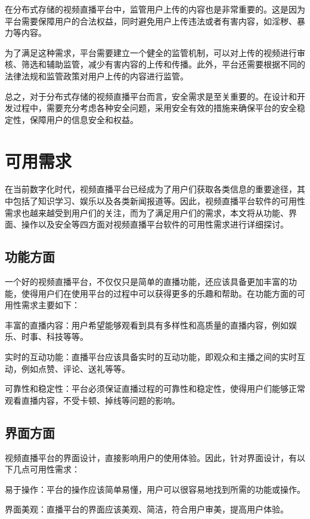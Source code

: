     在分布式存储的视频直播平台中，监管用户上传的内容也是非常重要的。这是因为平台需要保障用户的合法权益，同时避免用户上传违法或者有害内容，如淫秽、暴力等内容。
    
    为了满足这种需求，平台需要建立一个健全的监管机制，可以对上传的视频进行审核、筛选和辅助监管，减少有害内容的上传和传播。此外，平台还需要根据不同的法律法规和监管政策对用户上传的内容进行监管。

总之，对于分布式存储的视频直播平台而言，安全需求是至关重要的。在设计和开发过程中，需要充分考虑各种安全问题，采用安全有效的措施来确保平台的安全稳定性，保障用户的信息安全和权益。

\section{可用需求}

在当前数字化时代，视频直播平台已经成为了用户们获取各类信息的重要途径，其中包括了知识学习、娱乐以及各类新闻报道等。因此，视频直播平台软件的可用性需求也越来越受到用户们的关注，而为了满足用户们的需求，本文将从功能、界面、操作以及安全等四方面对视频直播平台软件的可用性需求进行详细探讨。

\subsection{功能方面}

一个好的视频直播平台，不仅仅只是简单的直播功能，还应该具备更加丰富的功能，使得用户们在使用平台的过程中可以获得更多的乐趣和帮助。在功能方面的可用性需求主要如下：

丰富的直播内容：用户希望能够观看到具有多样性和高质量的直播内容，例如娱乐、时事、科技等等。

实时的互动功能：直播平台应该具备实时的互动功能，即观众和主播之间的实时互动，例如点赞、评论、送礼等等。

可靠性和稳定性：平台必须保证直播过程的可靠性和稳定性，使得用户们能够正常观看直播内容，不受卡顿、掉线等问题的影响。

\subsection{界面方面}

视频直播平台的界面设计，直接影响用户的使用体验。因此，针对界面设计，有以下几点可用性需求：

易于操作：平台的操作应该简单易懂，用户可以很容易地找到所需的功能或操作。

界面美观：直播平台的界面应该美观、简洁，符合用户审美，提高用户体验。

